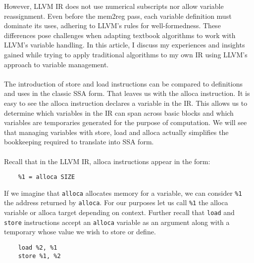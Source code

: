 \documentclass{article}
\begin{document}
However, LLVM IR does not use numerical subscripts nor allow variable
reassignment. Even before the mem2reg pass, each variable definition must
dominate its uses, adhering to LLVM's rules for well-formedness. These
differences pose challenges when adapting textbook algorithms to work with
LLVM's variable handling. In this article, I discuss my experiences and
insights gained while trying to apply traditional algorithms to my own IR using
LLVM's approach to variable management. \\~\\ The introduction of store and
load instructions can be compared to definitions and uses in the classic SSA
form. That leaves us with the alloca instruction. It is easy to see the alloca
instruction declares a variable in the IR. This allows us to determine which
variables in the IR can span across basic blocks and which variables are
temporaries generated for the purpose of computation. We will see that managing
variables with store, load and alloca actually simplifies the bookkeeping
required to translate into SSA form. \\~\\ Recall that in the LLVM IR, alloca
instructions appear in the form:
\begin{verbatim}
    %1 = alloca SIZE
\end{verbatim}
If we imagine that \verb|alloca| allocates memory for a variable, we can
consider \verb|%1| the address returned by \verb|alloca|. For our purposes let
us call \verb|%1| the alloca variable or alloca target depending on context.
Further recall that \verb|load| and \verb|store| instructions accept an
\verb|alloca| variable as an argument along with a temporary whose value we
wish to store or define.

\begin{verbatim}
    load %2, %1
    store %1, %2
\end{verbatim}
\end{document}
